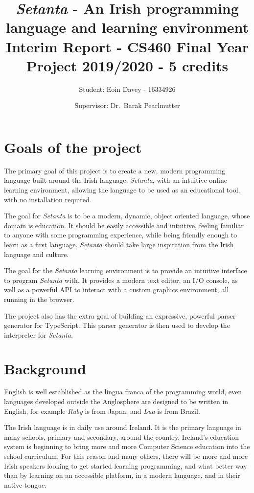 \documentclass[11pt]{extarticle}
\newcommand{\Setanta}{\emph{Setanta}}
\begin{document}
    \title{
    \LARGE \textbf{\Setanta{} - An Irish programming language and learning environment}\\
    \Large Interim Report - CS460 Final Year Project 2019/2020 - 5 credits}
    \author{\Large Student: Eoin Davey - 16334926 \and \Large Supervisor: Dr.\ Barak Pearlmutter}
    \maketitle
    \section{Goals of the project}

        The primary goal of this project is to create a new, modern programming language built around the Irish language, \Setanta{}, with an intuitive online learning environment, allowing the language to be used as an educational tool, with no installation required.

        The goal for \Setanta{} is to be a modern, dynamic, object oriented language, whose domain is education. It should be easily accessible and intuitive, feeling familiar to anyone with some programming experience, while being friendly enough to learn as a first language. \Setanta{} should take large inspiration from the Irish language and culture.

        The goal for the \Setanta{} learning environment is to provide an intuitive interface to program \Setanta{} with. It provides a modern text editor, an I/O console, as well as a powerful API to interact with a custom graphics environment, all running in the browser.

        The project also has the extra goal of building an expressive, powerful parser generator for TypeScript. This parser generator is then used to develop the interpreter for \Setanta{}.

    \section{Background}

        English is well established as the lingua franca of the programming world, even languages developed outside the Anglosphere are designed to be written in English, for example \emph{Ruby} is from Japan, and \emph{Lua} is from Brazil.
        
        The Irish language is in daily use around Ireland. It is the primary language in many schools, primary and secondary, around the country. Ireland's education system is beginning to bring more and more Computer Science education into the school curriculum. For this reason and many others, there will be more and more Irish speakers looking to get started learning programming, and what better way than by learning on an accessible platform, in a modern language, and in their native tongue.
\end{document}
